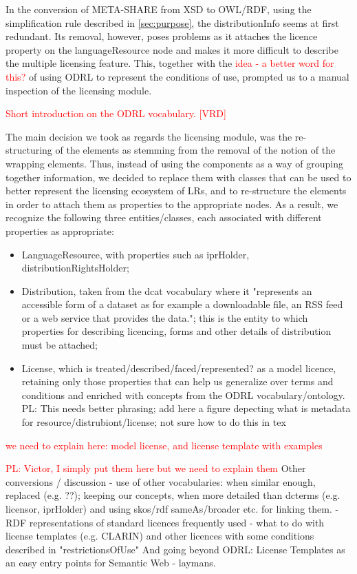 \documentclass{llncs}
\begin{document}
{In the conversion of META-SHARE from XSD to OWL/RDF, using the simplification rule described in \ref{sec:purpose}, the distributionInfo seems at first redundant. Its removal, however, poses problems as it attaches the licence property on the languageResource node and makes it more difficult to describe the multiple licensing feature. This, together with the \textcolor{red}{idea - a better word for this?} of using ODRL to represent the conditions of use, prompted us to a manual inspection of the licensing module.

\textcolor{red}{Short introduction on the ODRL vocabulary. [VRD]}

The main decision we took as regards the licensing module, was the re-structuring of the elements as stemming from the removal of the notion of the wrapping elements. Thus, instead of using the components as a way of grouping together information, we decided to replace them with classes that can be used to better represent the licensing ecosystem of LRs, and to re-structure the elements in order to attach them as properties to the appropriate nodes. As a result, we recognize the following three entities/classes, each associated with different properties as appropriate:
\begin{itemize}
\item LanguageResource, with properties such as iprHolder, distributionRightsHolder;
\item Distribution, taken from the dcat vocabulary where it "represents an accessible form of a dataset as for example a downloadable file, an RSS feed or a web service that provides the data."; this is the entity to which properties for describing licencing, forms and other details of distribution must be attached;
\item License, which is treated/described/faced/represented? as a model licence, retaining only those properties that can help us generalize over terms and conditions and enriched with concepts from the ODRL vocabulary/ontology. 
{PL: This needs better phrasing; add here a figure depecting what is metadata for resource/distrubiont/license; not sure how to do this in tex}
\end{itemize}
\textcolor{red}{we need to explain here: model license, and license template with examples} 

\textcolor{red}{PL: Victor, I simply put them here but we need to explain them}
Other conversions / discussion
- use of other vocabularies: when similar enough, replaced (e.g. ??); keeping our concepts, when more detailed than dcterms (e.g. licensor, iprHolder) and using skos/rdf sameAs/broader etc. for linking them.
- RDF representations of standard licences frequently used 
- what to do with license templates (e.g. CLARIN) and other licences with some conditions described in "restrictionsOfUse"
And going beyond ODRL: License Templates as an easy entry points for Semantic Web - laymans.






}
\end{document}
